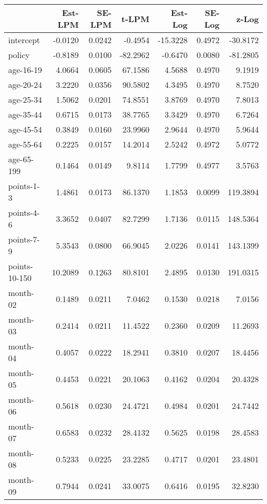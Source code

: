 \documentclass[10pt]{article}
\begin{document}
\begin{table}[ht]
\centering
\begin{tabular}{lrrrrrr}
  \hline
 & Est-LPM & SE-LPM & t-LPM & Est-Log & SE-Log & z-Log \\ 
  \hline
intercept & -0.0120 & 0.0242 & -0.4954 & -15.3228 & 0.4972 & -30.8172 \\ 
  policy & -0.8189 & 0.0100 & -82.2962 & -0.6470 & 0.0080 & -81.2805 \\ 
  age-16-19 & 4.0664 & 0.0605 & 67.1586 & 4.5688 & 0.4970 & 9.1919 \\ 
  age-20-24 & 3.2220 & 0.0356 & 90.5802 & 4.3495 & 0.4970 & 8.7520 \\ 
  age-25-34 & 1.5062 & 0.0201 & 74.8551 & 3.8769 & 0.4970 & 7.8013 \\ 
  age-35-44 & 0.6715 & 0.0173 & 38.7765 & 3.3429 & 0.4970 & 6.7264 \\ 
  age-45-54 & 0.3849 & 0.0160 & 23.9960 & 2.9644 & 0.4970 & 5.9644 \\ 
  age-55-64 & 0.2225 & 0.0157 & 14.2014 & 2.5242 & 0.4972 & 5.0772 \\ 
  age-65-199 & 0.1464 & 0.0149 & 9.8114 & 1.7799 & 0.4977 & 3.5763 \\ 
  points-1-3 & 1.4861 & 0.0173 & 86.1370 & 1.1853 & 0.0099 & 119.3894 \\ 
  points-4-6 & 3.3652 & 0.0407 & 82.7299 & 1.7136 & 0.0115 & 148.5364 \\ 
  points-7-9 & 5.3543 & 0.0800 & 66.9045 & 2.0226 & 0.0141 & 143.1399 \\ 
  points-10-150 & 10.2089 & 0.1263 & 80.8101 & 2.4895 & 0.0130 & 191.0315 \\ 
  month-02 & 0.1489 & 0.0211 & 7.0462 & 0.1530 & 0.0218 & 7.0156 \\ 
  month-03 & 0.2414 & 0.0211 & 11.4522 & 0.2360 & 0.0209 & 11.2693 \\ 
  month-04 & 0.4057 & 0.0222 & 18.2941 & 0.3810 & 0.0207 & 18.4456 \\ 
  month-05 & 0.4453 & 0.0221 & 20.1063 & 0.4162 & 0.0204 & 20.4328 \\ 
  month-06 & 0.5618 & 0.0230 & 24.4721 & 0.4984 & 0.0201 & 24.7442 \\ 
  month-07 & 0.6583 & 0.0232 & 28.4132 & 0.5625 & 0.0198 & 28.4583 \\ 
  month-08 & 0.5233 & 0.0225 & 23.2285 & 0.4717 & 0.0201 & 23.4801 \\ 
  month-09 & 0.7944 & 0.0241 & 33.0075 & 0.6416 & 0.0195 & 32.8230 \\ 

\end{tabular}
\end{table}
\end{document}
